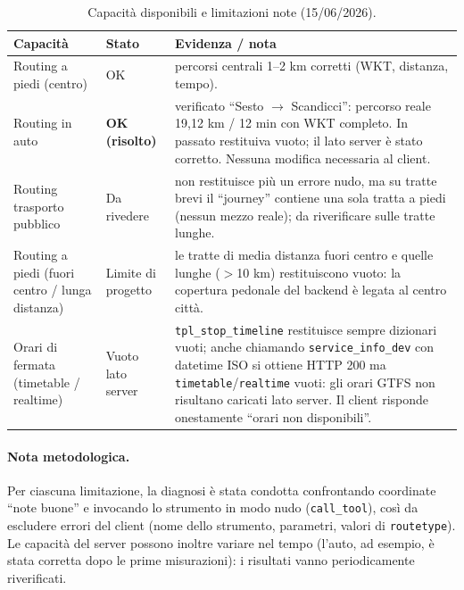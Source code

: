 \documentclass[11pt,a4paper]{article}
\begin{document}
\begin{table}[h]
\centering
\begin{tabular}{p{3.2cm}p{3.0cm}p{6.5cm}}
\toprule
\textbf{Capacità} & \textbf{Stato} & \textbf{Evidenza / nota} \\
\midrule
Routing a piedi (centro) & OK & percorsi centrali 1--2 km corretti (WKT, distanza, tempo). \\
\addlinespace
Routing in auto & \textbf{OK (risolto)} & verificato ``Sesto $\rightarrow$ Scandicci'': percorso reale 19,12 km / 12 min con WKT completo. In passato restituiva vuoto; il lato server è stato corretto. Nessuna modifica necessaria al client. \\
\addlinespace
Routing trasporto pubblico & Da rivedere & non restituisce più un errore nudo, ma su tratte brevi il ``journey'' contiene una sola tratta a piedi (nessun mezzo reale); da riverificare sulle tratte lunghe. \\
\addlinespace
Routing a piedi (fuori centro / lunga distanza) & Limite di progetto & le tratte di media distanza fuori centro e quelle lunghe ($>$10 km) restituiscono vuoto: la copertura pedonale del backend è legata al centro città. \\
\addlinespace
Orari di fermata (timetable / realtime) & Vuoto lato server & \texttt{tpl\_stop\_timeline} restituisce sempre dizionari vuoti; anche chiamando \texttt{service\_info\_dev} con datetime ISO si ottiene HTTP 200 ma \texttt{timetable}/\texttt{realtime} vuoti: gli orari GTFS non risultano caricati lato server. Il client risponde onestamente ``orari non disponibili''. \\
\bottomrule
\end{tabular}
\caption{Capacità disponibili e limitazioni note (15/06/2026).}
\label{tab:limiti}
\end{table}

\paragraph{Nota metodologica.} Per ciascuna limitazione, la diagnosi è stata
condotta confrontando coordinate ``note buone'' e invocando lo strumento in modo
nudo (\texttt{call\_tool}), così da escludere errori del client (nome dello
strumento, parametri, valori di \texttt{routetype}). Le capacità del server
possono inoltre variare nel tempo (l'auto, ad esempio, è stata corretta dopo le
prime misurazioni): i risultati vanno periodicamente riverificati.

\end{document}
